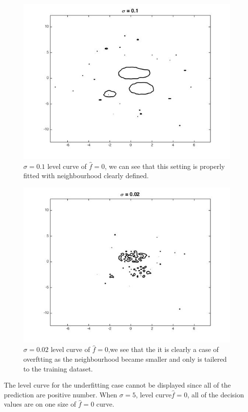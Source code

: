 \documentclass[twoside]{article}
\theoremstyle{definition}
\theoremstyle{definition}
\theoremstyle{remark}
\begin{document}
\begin{figure}[H]
\centering
\includegraphics[width=120mm]{sigma_1_level_curve.jpg}
\caption{ $\sigma = 0.1$ level curve of $\hat f = 0$, we can see that this setting is properly fitted with neighbourhood clearly defined. \label{problem2Pic6}}
\end{figure}

\begin{figure}[H]
\centering
\includegraphics[width=120mm]{sigma_002_lc.jpg}
\caption{ $\sigma = 0.02$ level curve of $\hat f = 0$,we see that the it is clearly a case of overftting as the neighbourhood became smaller and only is tailered to the training dataset. \label{problem2Pic6}}
\end{figure}

The level curve for the underfitting case cannot be displayed since all of the prediction are positive number. When $\sigma = 5$, level curve$\hat f = 0$, all of the decision values are on one size of $\hat f = 0$ curve.
\end{document}

